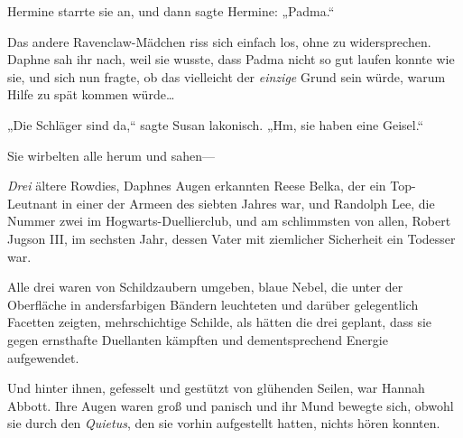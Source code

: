 Hermine starrte sie an, und dann sagte Hermine: „Padma.“

Das andere Ravenclaw-Mädchen riss sich einfach los, ohne zu widersprechen. Daphne sah ihr nach, weil sie wusste, dass Padma nicht so gut laufen konnte wie sie, und sich nun fragte, ob das vielleicht der \emph{einzige} Grund sein würde, warum Hilfe zu spät kommen würde…

„Die Schläger sind da,“ sagte Susan lakonisch. „Hm, sie haben eine Geisel.“

Sie wirbelten alle herum und sahen—

\emph{Drei} ältere Rowdies, Daphnes Augen erkannten Reese Belka, der ein Top-Leutnant in einer der Armeen des siebten Jahres war, und Randolph Lee, die Nummer zwei im Hogwarts-Duellierclub, und am schlimmsten von allen, Robert Jugson III, im sechsten Jahr, dessen Vater mit ziemlicher Sicherheit ein Todesser war.

Alle drei waren von Schildzaubern umgeben, blaue Nebel, die unter der Oberfläche in andersfarbigen Bändern leuchteten und darüber gelegentlich Facetten zeigten, mehrschichtige Schilde, als hätten die drei geplant, dass sie gegen ernsthafte Duellanten kämpften und dementsprechend Energie aufgewendet.

Und hinter ihnen, gefesselt und gestützt von glühenden Seilen, war Hannah Abbott. Ihre Augen waren groß und panisch und ihr Mund bewegte sich, obwohl sie durch den \emph{Quietus}, den sie vorhin aufgestellt hatten, nichts hören konnten.

